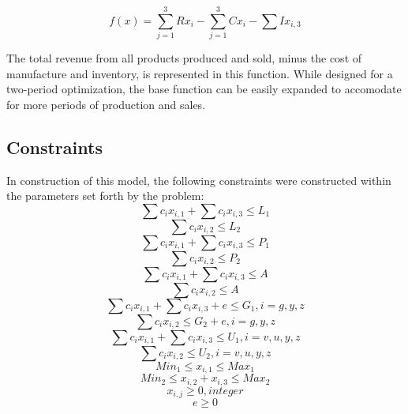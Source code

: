 \documentclass{article}
\begin{document}
$$f(x) = \sum_{j=1}^{3}Rx_{i} - \sum_{j=1}^{3}Cx_{i} - \sum Ix_{i,3} $$

The total revenue from all products produced and sold, minus the cost of manufacture and inventory, is represented in this function.  While designed for a two-period optimization, the base function can be easily expanded to accomodate for more periods of production and sales.
\subsection{Constraints}
In construction of this model, the following constraints were constructed within the parameters set forth by the problem:
\begin{equation}
\sum c_{i}x_{i,1} + \sum c_{i}x_{i,3} \leq L_{1} %
\end{equation}
\begin{equation}
\sum c_{i}x_{i,2} \leq L_{2} %
\end{equation}
\begin{equation}
\sum c_{i}x_{i,1} + \sum c_{i}x_{i,3} \leq P_{1} %
\end{equation}
\begin{equation}
\sum c_{i}x_{i,2} \leq P_{2}%
\end{equation}
\begin{equation}
\sum c_{i}x_{i,1} + \sum c_{i}x_{i,3} \leq A %
\end{equation}
\begin{equation}
\sum c_{i}x_{i,2} \leq A %
\end{equation}
\begin{equation}
\sum c_{i}x_{i,1} + \sum c_{i}x_{i,3} + e \leq G_{1},  i = g, y, z %
\end{equation}
\begin{equation}
\sum c_{i}x_{i,2} \leq G_{2} + e, i = g, y, z %
\end{equation}
\begin{equation}
\sum c_{i}x_{i,1} + \sum c_{i}x_{i,3} \leq U_{1} , i = v, u, y, z %
\end{equation}
\begin{equation}
\sum c_{i}x_{i,2} \leq U_{2},  i = v, u, y, z %
\end{equation}
\begin{equation}
Min_{1} \leq x_{i,1} \leq Max_{1} %
\end{equation}
\begin{equation}
Min_{2} \leq x_{i,2} + x_{i,3} \leq Max_{2}
\end{equation}
\begin{equation}
x_{i,j} \geq 0, integer %
\end{equation}
\begin{equation}
e \geq 0
\end{equation}
\end{document}
